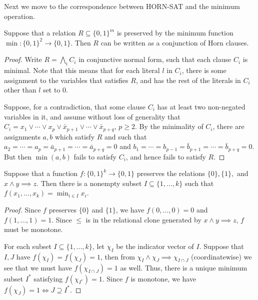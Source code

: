 Next we move to the correspondence between HORN-SAT and the minimum operation.

\begin{thm} Suppose that a relation $R \subseteq \{0,1\}^m$ is preserved by the minimum function $\min : \{0,1\}^2 \rightarrow \{0,1\}$. Then $R$ can be written as a conjunction of Horn clauses.
\end{thm}
\begin{proof} Write $R = \bigwedge_i C_i$ in conjunctive normal form, such that each clause $C_i$ is minimal. Note that this means that for each literal $l$ in $C_i$, there is some assignment to the variables that satisfies $R$, and has the rest of the literals in $C_i$ other than $l$ set to $0$.

Suppose, for a contradiction, that some clause $C_i$ has at least two non-negated variables in it, and assume without loss of generality that $C_i = x_1 \vee \cdots \vee x_p \vee \bar{x}_{p+1} \vee \cdots \vee \bar{x}_{p+q}$, $p \ge 2$. By the minimality of $C_i$, there are assignments $a, b$ which satisfy $R$ and such that $a_2 = \cdots = a_p = \bar{a}_{p+1} = \cdots = \bar{a}_{p+q} = 0$ and $b_1 = \cdots = b_{p-1} = \bar{b}_{p+1} = \cdots = \bar{b}_{p+q} = 0$. But then $\min(a,b)$ fails to satisfy $C_i$, and hence fails to satisfy $R$.
\end{proof}

\begin{thm} Suppose that a function $f : \{0,1\}^k \rightarrow \{0,1\}$ preserves the relations $\{0\}, \{1\},$ and $x\wedge y \implies z$. Then there is a nonempty subset $I \subseteq \{1, ..., k\}$ such that $f(x_1, ..., x_k) = \min_{i \in I} x_i$.
\end{thm}
\begin{proof} Since $f$ preserves $\{0\}$ and $\{1\}$, we have $f(0,...,0) = 0$ and $f(1, ..., 1) = 1$. Since $\le$ is in the relational clone generated by $x \wedge y \implies z$, $f$ must be monotone.

For each subset $I \subseteq \{1, ..., k\}$, let $\chi_I$ be the indicator vector of $I$. Suppose that $I,J$ have $f(\chi_I) = f(\chi_J) = 1$, then from $\chi_I \wedge \chi_J \implies \chi_{I\cap J}$ (coordinatewise) we see that we must have $f(\chi_{I\cap J}) = 1$ as well. Thus, there is a unique minimum subset $I^*$ satisfying $f(\chi_{I^*}) = 1$. Since $f$ is monotone, we have $f(\chi_J) = 1 \iff J \supseteq I^*$.
\end{proof}

